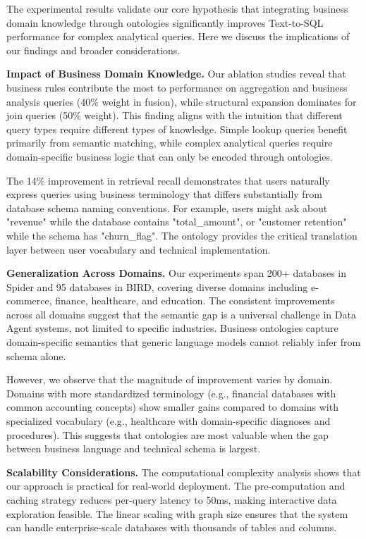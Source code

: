 \documentclass[sigconf, nonatbib]{acmart}
\begin{document}
The experimental results validate our core hypothesis that integrating business domain knowledge through ontologies significantly improves Text-to-SQL performance for complex analytical queries. Here we discuss the implications of our findings and broader considerations.

\textbf{Impact of Business Domain Knowledge.} Our ablation studies reveal that business rules contribute the most to performance on aggregation and business analysis queries (40\% weight in fusion), while structural expansion dominates for join queries (50\% weight). This finding aligns with the intuition that different query types require different types of knowledge. Simple lookup queries benefit primarily from semantic matching, while complex analytical queries require domain-specific business logic that can only be encoded through ontologies.

The 14\% improvement in retrieval recall demonstrates that users naturally express queries using business terminology that differs substantially from database schema naming conventions. For example, users might ask about "revenue" while the database contains "total\_amount", or "customer retention" while the schema has "churn\_flag". The ontology provides the critical translation layer between user vocabulary and technical implementation.

\textbf{Generalization Across Domains.} Our experiments span 200+ databases in Spider and 95 databases in BIRD, covering diverse domains including e-commerce, finance, healthcare, and education. The consistent improvements across all domains suggest that the semantic gap is a universal challenge in Data Agent systems, not limited to specific industries. Business ontologies capture domain-specific semantics that generic language models cannot reliably infer from schema alone.

However, we observe that the magnitude of improvement varies by domain. Domains with more standardized terminology (e.g., financial databases with common accounting concepts) show smaller gains compared to domains with specialized vocabulary (e.g., healthcare with domain-specific diagnoses and procedures). This suggests that ontologies are most valuable when the gap between business language and technical schema is largest.

\textbf{Scalability Considerations.} The computational complexity analysis shows that our approach is practical for real-world deployment. The pre-computation and caching strategy reduces per-query latency to 50ms, making interactive data exploration feasible. The linear scaling with graph size ensures that the system can handle enterprise-scale databases with thousands of tables and columns.
\end{document}

